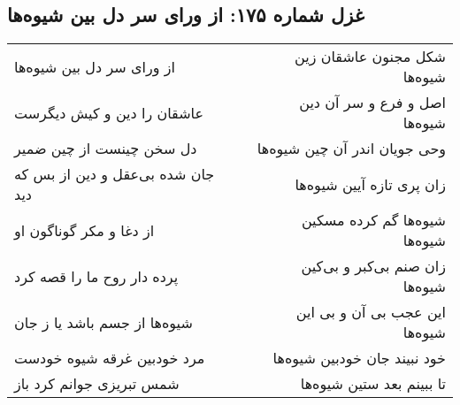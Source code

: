 \begin{center}
\section*{غزل شماره ۱۷۵: از ورای سر دل بین شیوه‌ها}
\label{sec:0175}
\begin{longtable}{l p{0.5cm} r}
از ورای سر دل بین شیوه‌ها
&&
شکل مجنون عاشقان زین شیوه‌ها
\\
عاشقان را دین و کیش دیگرست
&&
اصل و فرع و سر آن دین شیوه‌ها
\\
دل سخن چینست از چین ضمیر
&&
وحی جویان اندر آن چین شیوه‌ها
\\
جان شده بی‌عقل و دین از بس که دید
&&
زان پری تازه آیین شیوه‌ها
\\
از دغا و مکر گوناگون او
&&
شیوه‌ها گم کرده مسکین شیوه‌ها
\\
پرده دار روح ما را قصه کرد
&&
زان صنم بی‌کبر و بی‌کین شیوه‌ها
\\
شیوه‌ها از جسم باشد یا ز جان
&&
این عجب بی آن و بی این شیوه‌ها
\\
مرد خودبین غرقه شیوه خودست
&&
خود نبیند جان خودبین شیوه‌ها
\\
شمس تبریزی جوانم کرد باز
&&
تا ببینم بعد ستین شیوه‌ها
\\
\end{longtable}
\end{center}

